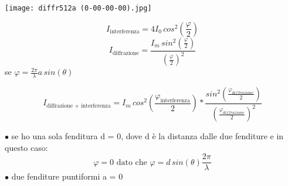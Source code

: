 \documentclass[a4paper,11pt]{article}
\begin{document}
\begin{center}  
\begin{minipage}{15cm}
    \texttt{[image: diffr512a (0-00-00-00).jpg]}
    \end{minipage}
\end{center}


\[
    I_\text{interferenza} = 4I_0 \, cos^2(\frac{\varphi}{2})
\]
\[
I_\text{diffrazione} = \frac{I_m \, sin^2(\frac{\varphi}{2})}{(\frac{\varphi}{2})^2}    
\]
se \( \varphi = \frac{2\pi}{\lambda} a \, sin(\theta)\)

\begin{center}
\[
I_\text{diffrazione + interferenza}  = I_m \, cos^2 (\frac{\varphi_\text{interferenza}}{2}) * \frac{sin^2(\frac{\varphi_{diffrazione}}{2})}{(\frac{\varphi_{diffrazione}}{2})^2}
\]
\end{center}

$\bullet$
se ho una sola fenditura d = 0, dove d è la distanza dalle due fenditure e in questo caso:
\[
\varphi = 0 \, \, \text{dato che} \, \, \varphi = d \, sin(\theta) \frac{2\pi}{\lambda}    
\]
$\bullet$
due fenditure puntiformi a = 0
\end{document}
